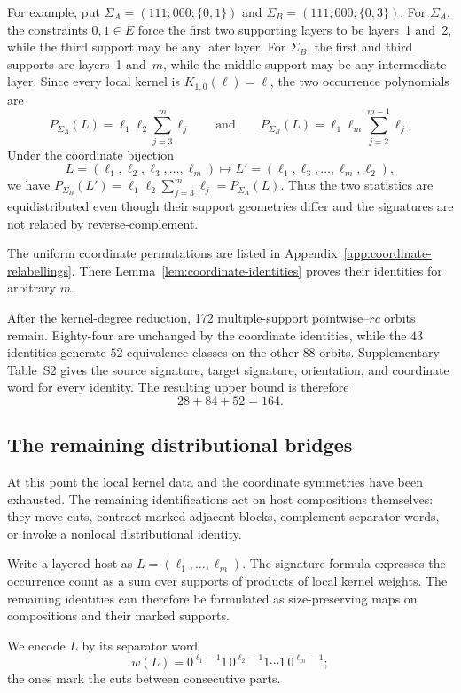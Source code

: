 \documentclass[12pt]{article}
\begin{document}
For example, put $\Sigma_A=(111;000;\{0,1\})$ and
$\Sigma_B=(111;000;\{0,3\})$.
For $\Sigma_A$, the constraints $0,1\in E$ force the first two supporting
layers to be layers~1 and~2, while the third support may be any later layer.
For $\Sigma_B$, the first and third supports are layers~1 and~$m$, while the
middle support may be any intermediate layer.  Since every local kernel is
$K_{1,0}(\ell)=\ell$, the two occurrence polynomials are
\[
P_{\Sigma_A}(L)=\ell_1\ell_2\sum_{j=3}^m\ell_j
\qquad\text{and}\qquad
P_{\Sigma_B}(L)=\ell_1\ell_m\sum_{j=2}^{m-1}\ell_j.
\]
Under the coordinate bijection
\[
L=(\ell_1,\ell_2,\ell_3,\ldots,\ell_m)
\longmapsto
L'=(\ell_1,\ell_3,\ldots,\ell_m,\ell_2),
\]
we have
$P_{\Sigma_B}(L')=\ell_1\ell_2\sum_{j=3}^m\ell_j=P_{\Sigma_A}(L)$.
Thus the two statistics are equidistributed even though their support
geometries differ and the signatures are not related by reverse-complement.

The uniform coordinate permutations are listed in
Appendix~\ref{app:coordinate-relabellings}.  There
Lemma~\ref{lem:coordinate-identities} proves their identities for arbitrary $m$.

After the kernel-degree reduction, 172 multiple-support pointwise--$rc$ orbits
remain.  Eighty-four are unchanged by the coordinate identities, while the
$43$ identities generate $52$ equivalence classes on the other $88$ orbits.
Supplementary Table~S2 gives the source signature, target signature,
orientation, and coordinate word for every identity.  The resulting upper
bound is therefore
\[
28+84+52=164.
\]

\subsection{The remaining distributional bridges}\label{sec:bridges}
At this point the local kernel data and the coordinate symmetries have been
exhausted.  The remaining identifications act on host compositions themselves:
they move cuts, contract marked adjacent blocks, complement separator words,
or invoke a nonlocal distributional identity.

Write a layered host as $L=(\ell_1,\ldots,\ell_m)$.  The signature formula
expresses the occurrence count as a sum over supports of products of local
kernel weights.  The remaining identities can therefore be formulated as
size-preserving maps on compositions and their marked supports.

We encode $L$ by its separator word
\[
w(L)=0^{\ell_1-1}1\,0^{\ell_2-1}1\cdots
1\,0^{\ell_m-1};
\]
the ones mark the cuts between consecutive parts.
\end{document}
